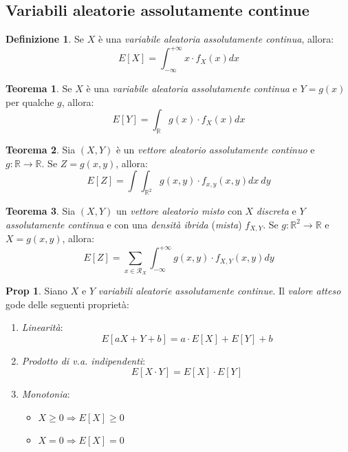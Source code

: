 \documentclass[12pt, a4paper]{report}
\theoremstyle{definition}
\newtheorem{definition}{Definizione}[section]
\newtheorem{theorem}{Teorema}[section]
\newtheorem*{proposition}{Prop}
\DeclareRobustCommand{\R}{\mathbb{R}}%
\DeclareRobustCommand{\supp}{\mathcal{R}}%
\begin{document}
\subsection{Variabili aleatorie assolutamente continue}

\begin{definition}
	Se $X$ è una \emph{variabile aleatoria assolutamente continua}, allora:
	\[E[X]=\int_{-\infty}^{+\infty}x\cdot f_X(x)dx\]
\end{definition}
\begin{theorem}
	Se $X$ è una \emph{variabile aleatoria assolutamente continua} e $Y=g(x)$
	per qualche $g$, allora:
	\[E[Y]=\int_{\R}g(x)\cdot f_X(x)dx\]
\end{theorem}
\begin{theorem}
	Sia $(X,Y)$ è un \emph{vettore aleatorio assolutamente continuo} e $g:\R
	\rightarrow\R$. Se $Z=g(x,y)$, allora:
	\[E[Z]=\int\int_{\R^2}g(x,y)\cdot f_{x,y}(x,y)dx\ dy\]
\end{theorem}
\begin{theorem}
	Sia $(X,Y)$ un \emph{vettore aleatorio misto} con $X$ \emph{discreta} e $Y$
	\emph{assolutamente continua} e con una \emph{densità ibrida} (\emph{mista})
	$f_{X,Y}$. Se $g:\R^2\rightarrow\R$ e $X=g(x,y)$, allora:
	\[E[Z]=\sum_{x\in\supp_X}\int_{-\infty}^{+\infty}g(x,y)\cdot f_{X,Y}(x,y)dy\]
\end{theorem}

\begin{proposition}
	Siano $X$ e $Y$ \emph{variabili aleatorie assolutamente continue}. Il \emph
	{valore atteso} gode delle seguenti proprietà:
	\begin{enumerate}[label=(\roman*)]
		\item \emph{Linearità}:
		\[E[aX+Y+b]=a\cdot E[X]+E[Y]+b\]
		\item \emph{Prodotto di v.a. indipendenti}:
		\[E[X\cdot Y]=E[X]\cdot E[Y]\]
		\item \emph{Monotonia}:
		\begin{itemize}
			\item \({X\geq 0}\Rightarrow E[X]\geq 0\)
			\item \({X=0}\Rightarrow E[X]=0\)
		\end{itemize}
	\end{enumerate}
\end{proposition}
\end{document}
